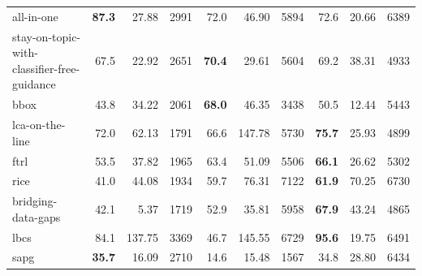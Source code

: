 \documentclass{article}
\begin{document}
\begin{table}[h]
{\begin{tabular}{l rrr rrr rrr}
    all-in-one                                    & \textbf{87.3} & 27.88 & 2991 &  72.0 & 46.90 &  5894 & 72.6 & 20.66 & 6389 \\
    stay-on-topic-with-classifier-free-guidance   & 67.5 & 22.92 & 2651 &  \textbf{70.4} & 29.61 &  5604 & 69.2 & 38.31 & 4933 \\
    bbox                                          & 43.8 & 34.22 & 2061 &  \textbf{68.0} & 46.35 &  3438 & 50.5 & 12.44 & 5443 \\
    lca-on-the-line                               & 72.0 & 62.13 & 1791 &  66.6 & 147.78 &  5730 & \textbf{75.7} & 25.93 & 4899 \\
    ftrl                                          & 53.5 & 37.82 & 1965 &  63.4 & 51.09 &  5506 & \textbf{66.1} & 26.62 & 5302 \\
    rice                                          & 41.0 & 44.08 & 1934 &  59.7 & 76.31 &  7122 & \textbf{61.9} & 70.25 & 6730 \\
    bridging-data-gaps                            & 42.1 &  5.37 & 1719 &  52.9 & 35.81 &  5958 & \textbf{67.9} & 43.24 & 4865 \\
    lbcs                                          & 84.1 & 137.75 & 3369 &  46.7 & 145.55 &  6729 & \textbf{95.6} & 19.75 & 6491 \\
    sapg                                          & \textbf{35.7} & 16.09 & 2710 &  14.6 & 15.48 &  1567 & 34.8 & 28.80 & 6434 \\
    \bottomrule
  \end{tabular}}
\end{table}
\end{document}

